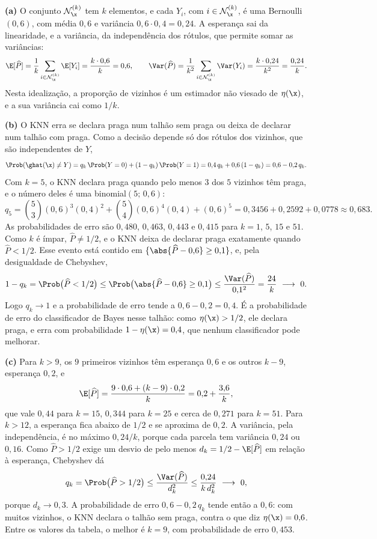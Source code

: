 \begin{solucao}
\textbf{(a)} O conjunto $\mathcal{N}_{\x}^{(k)}$ tem $k$ elementos, e cada $Y_i$, com
$i\in\mathcal{N}_{\x}^{(k)}$, é uma Bernoulli$(0{,}6)$, com média $0{,}6$ e variância
$0{,}6\cdot0{,}4=0{,}24$. A esperança sai da linearidade, e a variância, da independência dos
rótulos, que permite somar as variâncias:
\[
  \E[\widehat P]=\frac1k\sum_{i\in\mathcal{N}_{\x}^{(k)}}\E[Y_i]=\frac{k\cdot0{,}6}{k}=0{,}6,
  \qquad
  \Var(\widehat P)=\frac1{k^2}\sum_{i\in\mathcal{N}_{\x}^{(k)}}\Var(Y_i)
  =\frac{k\cdot0{,}24}{k^2}=\frac{0{,}24}{k} .
\]
Nesta idealização, a proporção de vizinhos é um estimador não viesado de $\eta(\x)$, e a sua
variância cai como $1/k$.

\smallskip
\textbf{(b)} O KNN erra se declara praga num talhão sem praga ou deixa de declarar num talhão
com praga. Como a decisão depende só dos rótulos dos vizinhos, que são independentes de $Y$,
\[
  \Prob(\ghat(\x)\ne Y)=q_k\,\Prob(Y=0)+(1-q_k)\,\Prob(Y=1)=0{,}4\,q_k+0{,}6\,(1-q_k)=0{,}6-0{,}2\,q_k .
\]
Com $k=5$, o KNN declara praga quando pelo menos $3$ dos $5$ vizinhos têm praga, e o número
deles é uma binomial$(5;\,0{,}6)$:
\[
  q_5=\binom53(0{,}6)^3(0{,}4)^2+\binom54(0{,}6)^4(0{,}4)+(0{,}6)^5
     =0{,}3456+0{,}2592+0{,}0778\approx0{,}683 .
\]
As probabilidades de erro são $0{,}480$, $0{,}463$, $0{,}443$ e $0{,}415$ para $k=1$, $5$, $15$ e
$51$. Como $k$ é ímpar, $\widehat P\ne1/2$, e o KNN deixa de declarar praga exatamente
quando $\widehat P<1/2$. Esse evento está contido em
$\{\abs{\widehat P-0{,}6}\ge0{,}1\}$, e, pela desigualdade de Chebyshev,
\[
  1-q_k=\Prob\big(\widehat P<1/2\big)\le\Prob\big(\abs{\widehat P-0{,}6}\ge0{,}1\big)
  \le\frac{\Var(\widehat P)}{0{,}1^2}=\frac{24}{k}\ \longrightarrow\ 0 .
\]
Logo $q_k\to1$ e a probabilidade de erro tende a $0{,}6-0{,}2=0{,}4$. É a probabilidade de
erro do classificador de Bayes nesse talhão: como $\eta(\x)>1/2$, ele declara praga, e erra
com probabilidade $1-\eta(\x)=0{,}4$, que nenhum classificador pode melhorar.

\smallskip
\textbf{(c)} Para $k>9$, os $9$ primeiros vizinhos têm esperança $0{,}6$ e os outros $k-9$,
esperança $0{,}2$, e
\[
  \E[\widehat P]=\frac{9\cdot0{,}6+(k-9)\cdot0{,}2}{k}=0{,}2+\frac{3{,}6}{k} ,
\]
que vale $0{,}44$ para $k=15$, $0{,}344$ para $k=25$ e cerca de $0{,}271$ para $k=51$. Para
$k>12$, a esperança fica abaixo de $1/2$ e se aproxima de $0{,}2$. A variância, pela
independência, é no máximo $0{,}24/k$, porque cada parcela tem variância $0{,}24$ ou $0{,}16$.
Como $\widehat P>1/2$ exige um desvio de pelo menos $d_k=1/2-\E[\widehat P]$ em relação à
esperança, Chebyshev dá
\[
  q_k=\Prob\big(\widehat P>1/2\big)\le\frac{\Var(\widehat P)}{d_k^2}\le\frac{0{,}24}{k\,d_k^2}\ \longrightarrow\ 0 ,
\]
porque $d_k\to0{,}3$. A probabilidade de erro $0{,}6-0{,}2\,q_k$ tende então a $0{,}6$: com
muitos vizinhos, o KNN declara o talhão sem praga, contra o que diz $\eta(\x)=0{,}6$. Entre os
valores da tabela, o melhor é $k=9$, com probabilidade de erro $0{,}453$.


\end{solucao}

